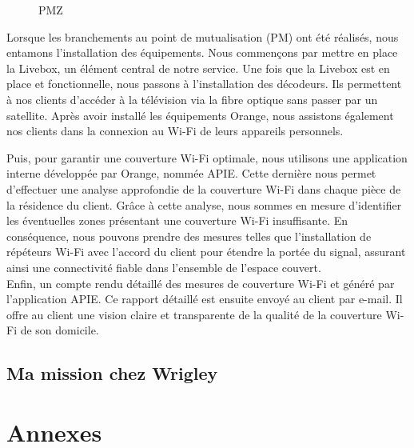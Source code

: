 \documentclass[12pt, a4paper]{article}
\begin{document}
\begin{figure}[htbp]
\begin{minipage}[b]{0.4\textwidth}
      \caption{PMZ}
    \end{minipage}
\end{figure}

Lorsque les branchements au point de mutualisation (PM) ont été réalisés,
nous entamons l'installation des équipements. Nous commençons par mettre en place la Livebox,
un élément central de notre service.
Une fois que la Livebox est en place et fonctionnelle,
nous passons à l'installation des décodeurs. Ils
permettent à nos clients d'accéder à la télévision via la fibre optique
sans passer par un satellite. 
Après avoir installé les équipements Orange, nous assistons également
nos clients dans la connexion au Wi-Fi de leurs appareils personnels.

\newpage
Puis, pour garantir une couverture Wi-Fi optimale, nous utilisons une
application interne développée par Orange,
nommée APIE. Cette dernière nous permet d'effectuer
une analyse approfondie de la couverture Wi-Fi dans chaque pièce
de la résidence du client. Grâce à cette analyse,
nous sommes en mesure d'identifier les éventuelles zones
présentant une couverture Wi-Fi insuffisante. En conséquence,
nous pouvons prendre des mesures telles que
l'installation de répéteurs Wi-Fi avec l'accord du client 
pour étendre la portée du signal,
assurant ainsi une connectivité fiable dans l'ensemble de l'espace couvert.\\

Enfin, un compte rendu détaillé des mesures de couverture Wi-Fi
et généré par l'application APIE. Ce rapport détaillé est
ensuite envoyé au client par e-mail. Il offre au client une
vision claire et transparente de la qualité de la couverture Wi-Fi
de son domicile.

\newpage
\subsection{Ma mission chez Wrigley}
\section{Annexes}
\end{document}
